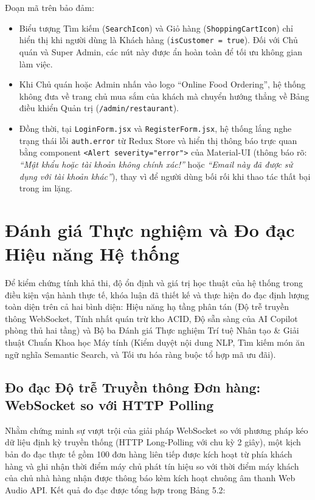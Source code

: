 \documentclass{uetgraduation}
\begin{document}
Đoạn mã trên bảo đảm:
\begin{itemize}
    \item Biểu tượng Tìm kiếm (\texttt{SearchIcon}) và Giỏ hàng (\texttt{ShoppingCartIcon}) chỉ hiển thị khi người dùng là Khách hàng (\texttt{isCustomer = true}). Đối với Chủ quán và Super Admin, các nút này được ẩn hoàn toàn để tối ưu không gian làm việc.
    \item Khi Chủ quán hoặc Admin nhấn vào logo ``Online Food Ordering'', hệ thống không đưa về trang chủ mua sắm của khách mà chuyển hướng thẳng về Bảng điều khiển Quản trị (\texttt{/admin/restaurant}).
    \item Đồng thời, tại \texttt{LoginForm.jsx} và \texttt{RegisterForm.jsx}, hệ thống lắng nghe trạng thái lỗi \texttt{auth.error} từ Redux Store và hiển thị thông báo trực quan bằng component \texttt{<Alert severity="error">} của Material-UI (thông báo rõ: \textit{``Mật khẩu hoặc tài khoản không chính xác!''} hoặc \textit{``Email này đã được sử dụng với tài khoản khác''}), thay vì để người dùng bối rối khi thao tác thất bại trong im lặng.
\end{itemize}

\section{Đánh giá Thực nghiệm và Đo đạc Hiệu năng Hệ thống}
Để kiểm chứng tính khả thi, độ ổn định và giá trị học thuật của hệ thống trong điều kiện vận hành thực tế, khóa luận đã thiết kế và thực hiện đo đạc định lượng toàn diện trên cả hai bình diện: Hiệu năng hạ tầng phân tán (Độ trễ truyền thông WebSocket, Tính nhất quán trừ kho ACID, Độ sẵn sàng của AI Copilot phòng thủ hai tầng) và Bộ ba Đánh giá Thực nghiệm Trí tuệ Nhân tạo \& Giải thuật Chuẩn Khoa học Máy tính (Kiểm duyệt nội dung NLP, Tìm kiếm món ăn ngữ nghĩa Semantic Search, và Tối ưu hóa ràng buộc tổ hợp mã ưu đãi).

\clearpage
\subsection{Đo đạc Độ trễ Truyền thông Đơn hàng: WebSocket so với HTTP Polling}
Nhằm chứng minh sự vượt trội của giải pháp WebSocket so với phương pháp kéo dữ liệu định kỳ truyền thống (HTTP Long-Polling với chu kỳ 2 giây), một kịch bản đo đạc thực tế gồm 100 đơn hàng liên tiếp được kích hoạt từ phía khách hàng và ghi nhận thời điểm máy chủ phát tín hiệu so với thời điểm máy khách của chủ nhà hàng nhận được thông báo kèm kích hoạt chuông âm thanh Web Audio API. Kết quả đo đạc được tổng hợp trong Bảng 5.2:
\end{document}
